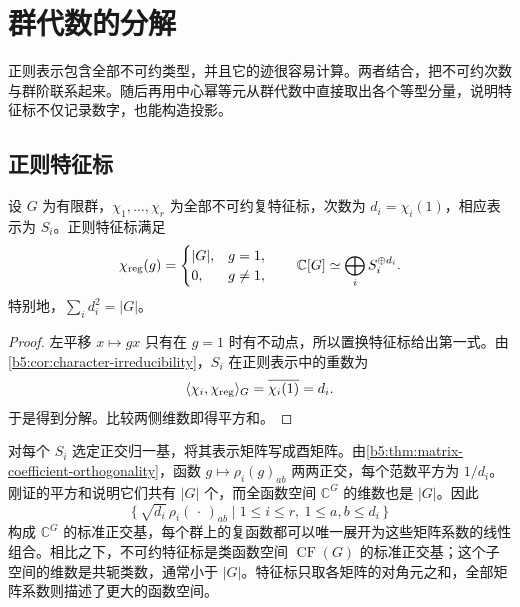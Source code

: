 

\section{群代数的分解}
\label{b5:sec:0203}

正则表示包含全部不可约类型，并且它的迹很容易计算。两者结合，把不可约次数与群阶联系起来。随后再用中心幂等元从群代数中直接取出各个等型分量，说明特征标不仅记录数字，也能构造投影。


\subsection{正则特征标}
\label{b5:subsec:0203:01}

\begin{theorem}\label{b5:thm:regular-decomposition}
	设 \(G\) 为有限群，\(\chi_1,\ldots,\chi_r\) 为全部不可约复特征标，次数为 \(d_i=\chi_i(1)\)，相应表示为 \(S_i\)。正则特征标满足
	\[
		\chi_{\rm reg}(g)=
		\begin{cases}|G|,&g=1,\\0,&g\ne1,\end{cases}
		\qquad \mathbb C[G]\simeq\bigoplus_iS_i^{\oplus d_i}.
	\]
	特别地，\(\sum_i d_i^2=|G|\)。
\end{theorem}
\begin{proof}
	左平移 \(x\mapsto gx\) 只有在 \(g=1\) 时有不动点，所以置换特征标给出第一式。由\cref{b5:cor:character-irreducibility}，\(S_i\) 在正则表示中的重数为
	\[
		\langle\chi_i,\chi_{\rm reg}\rangle_G =\overline{\chi_i(1)}=d_i.
	\]
	于是得到分解。比较两侧维数即得平方和。
\end{proof}

对每个 \(S_i\) 选定正交归一基，将其表示矩阵写成酉矩阵。由\cref{b5:thm:matrix-coefficient-orthogonality}，函数 \(g\mapsto\rho_i(g)_{ab}\) 两两正交，每个范数平方为 \(1/d_i\)。刚证的平方和说明它们共有 \(|G|\) 个，而全函数空间 \(\mathbb C^G\) 的维数也是 \(|G|\)。因此
\[
	\bigl\{\,\sqrt{d_i}\,\rho_i(\,\cdot\,)_{ab} \mid 1\le i\le r,\ 1\le a,b\le d_i\,\bigr\}
\]
构成 \(\mathbb C^G\) 的标准正交基，每个群上的复函数都可以唯一展开为这些矩阵系数的线性组合。相比之下，不可约特征标是类函数空间 \(\operatorname{CF}(G)\) 的标准正交基；这个子空间的维数是共轭类数，通常小于 \(|G|\)。特征标只取各矩阵的对角元之和，全部矩阵系数则描述了更大的函数空间。


